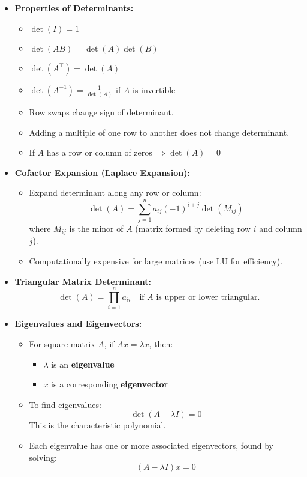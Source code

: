 \documentclass[9pt,letterpaper]{article}
\begin{document}
\begin{multicols*}{3}
\begin{itemize}
    \item \textbf{Properties of Determinants:}
      \begin{itemize}
        \item $\det(I) = 1$
        \item $\det(AB) = \det(A)\det(B)$
        \item $\det(A^\top) = \det(A)$
        \item $\det(A^{-1}) = \frac{1}{\det(A)}$ if $A$ is invertible
        \item Row swaps change sign of determinant.
        \item Adding a multiple of one row to another does not change determinant.
        \item If $A$ has a row or column of zeros $\Rightarrow \det(A) = 0$
      \end{itemize}

    \item \textbf{Cofactor Expansion (Laplace Expansion):}
      \begin{itemize}
        \item Expand determinant along any row or column:
          \[
            \det(A) = \sum_{j=1}^n a_{ij}(-1)^{i+j} \det(M_{ij}) 
          \]
          where $M_{ij}$ is the minor of $A$ (matrix formed by deleting row $i$ and column $j$).
        \item Computationally expensive for large matrices (use LU for efficiency).
      \end{itemize}

    \item \textbf{Triangular Matrix Determinant:}
      \[
        \det(A) = \prod_{i=1}^n a_{ii} \quad \text{if } A \text{ is upper or lower triangular}.
      \]

    \item \textbf{Eigenvalues and Eigenvectors:}
      \begin{itemize}
        \item For square matrix $A$, if $Ax = \lambda x$, then:
          \begin{itemize}
            \item $\lambda$ is an \textbf{eigenvalue}
            \item $x$ is a corresponding \textbf{eigenvector}
          \end{itemize}
        \item To find eigenvalues:
          \[
            \det(A - \lambda I) = 0
          \]
          This is the characteristic polynomial.
        \item Each eigenvalue has one or more associated eigenvectors, found by solving:
          \[
            (A - \lambda I)x = 0
          \]
      \end{itemize}


\end{itemize}
\end{multicols*}
\end{document}

